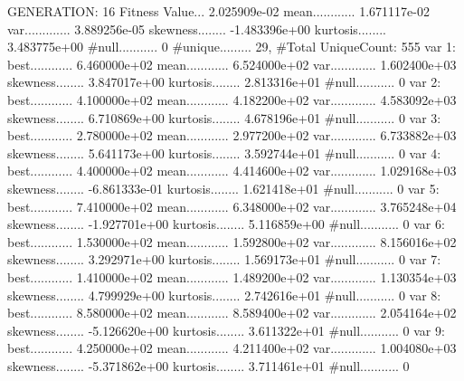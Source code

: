 \documentclass[oneside,letterpaper,titlepage]{article}
\begin{document}
\begin{Schunk}
\begin{Soutput}
GENERATION: 16
Fitness Value... 2.025909e-02
mean............ 1.671117e-02
var............. 3.889256e-05
skewness........ -1.483396e+00
kurtosis........ 3.483775e+00
#null........... 0
#unique......... 29, #Total UniqueCount: 555
var 1:
best............ 6.460000e+02
mean............ 6.524000e+02
var............. 1.602400e+03
skewness........ 3.847017e+00
kurtosis........ 2.813316e+01
#null........... 0
var 2:
best............ 4.100000e+02
mean............ 4.182200e+02
var............. 4.583092e+03
skewness........ 6.710869e+00
kurtosis........ 4.678196e+01
#null........... 0
var 3:
best............ 2.780000e+02
mean............ 2.977200e+02
var............. 6.733882e+03
skewness........ 5.641173e+00
kurtosis........ 3.592744e+01
#null........... 0
var 4:
best............ 4.400000e+02
mean............ 4.414600e+02
var............. 1.029168e+03
skewness........ -6.861333e-01
kurtosis........ 1.621418e+01
#null........... 0
var 5:
best............ 7.410000e+02
mean............ 6.348000e+02
var............. 3.765248e+04
skewness........ -1.927701e+00
kurtosis........ 5.116859e+00
#null........... 0
var 6:
best............ 1.530000e+02
mean............ 1.592800e+02
var............. 8.156016e+02
skewness........ 3.292971e+00
kurtosis........ 1.569173e+01
#null........... 0
var 7:
best............ 1.410000e+02
mean............ 1.489200e+02
var............. 1.130354e+03
skewness........ 4.799929e+00
kurtosis........ 2.742616e+01
#null........... 0
var 8:
best............ 8.580000e+02
mean............ 8.589400e+02
var............. 2.054164e+02
skewness........ -5.126620e+00
kurtosis........ 3.611322e+01
#null........... 0
var 9:
best............ 4.250000e+02
mean............ 4.211400e+02
var............. 1.004080e+03
skewness........ -5.371862e+00
kurtosis........ 3.711461e+01
#null........... 0


\end{Soutput}
\end{Schunk}
\end{document}

